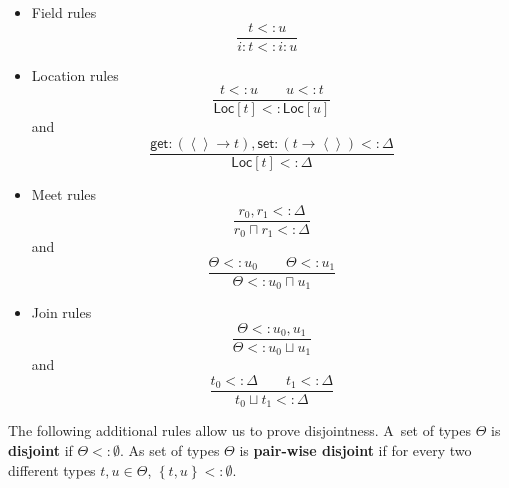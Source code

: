 \documentclass[12pt]{article}
\begin{document}
\begin{itemize}
\item Field rules%
\begin{equation*}
\frac{t<:u}{i\colon t<:i\colon u}\text{ }
\end{equation*}

\item Location rules%
\begin{equation*}
\frac{t<:u\qquad u<:t}{\mathsf{Loc}[t]<:\mathsf{Loc}[u]}
\end{equation*}%
and%
\begin{equation*}
\frac{\mathsf{get}\colon \left( \left\langle {}\right\rangle \rightarrow
t\right) ,\mathsf{set}\colon \left( t\rightarrow \left\langle
{}\right\rangle \right) <:\Delta }{\mathsf{Loc}[t]<:\Delta }
\end{equation*}

\item Meet rules%
\begin{equation*}
\frac{r_{0},r_{1}<:\Delta }{r_{0}\sqcap r_{1}<:\Delta }
\end{equation*}%
and%
\begin{equation*}
\frac{\Theta <:u_{0}\qquad \Theta <:u_{1}}{\Theta <:u_{0}\sqcap u_{1}}
\end{equation*}

\item Join rules%
\begin{equation*}
\frac{\Theta <:u_{0},u_{1}}{\Theta <:u_{0}\sqcup u_{1}}
\end{equation*}%
and%
\begin{equation*}
\frac{t_{0}<:\Delta \qquad t_{1}<:\Delta }{t_{0}\sqcup t_{1}<:\Delta }
\end{equation*}
\end{itemize}

The following additional rules allow us to prove disjointness. A\ set of
types $\Theta $ is \textbf{disjoint} if $\Theta <:\emptyset $. As set of
types $\Theta $ is \textbf{pair-wise disjoint} if for every two different
types $t,u\in \Theta $, $\left\{ t,u\right\} <:\emptyset $.
\end{document}
